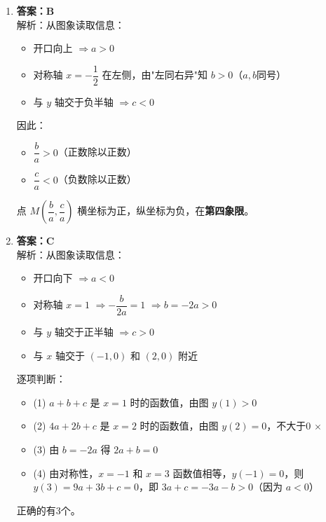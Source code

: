 \documentclass[12pt, a4paper]{article}
\begin{document}
\begin{answerbox}
    \begin{enumerate}
        \item \textbf{答案：B} \\
        解析：从图象读取信息：
        \begin{itemize}
            \item 开口向上 $\Rightarrow a > 0$
            \item 对称轴 $x = -\dfrac{1}{2}$ 在左侧，由"左同右异"知 $b > 0$（$a,b$同号）
            \item 与 $y$ 轴交于负半轴 $\Rightarrow c < 0$
        \end{itemize}
        因此：
        \begin{itemize}
            \item $\dfrac{b}{a} > 0$（正数除以正数）
            \item $\dfrac{c}{a} < 0$（负数除以正数）
        \end{itemize}
        点 $M\left(\dfrac{b}{a}, \dfrac{c}{a}\right)$ 横坐标为正，纵坐标为负，在\textbf{第四象限}。
        
        \item \textbf{答案：C} \\
        解析：从图象读取信息：
        \begin{itemize}
            \item 开口向下 $\Rightarrow a < 0$
            \item 对称轴 $x = 1$ $\Rightarrow -\dfrac{b}{2a} = 1$ $\Rightarrow b = -2a > 0$
            \item 与 $y$ 轴交于正半轴 $\Rightarrow c > 0$
            \item 与 $x$ 轴交于 $(-1,0)$ 和 $(2,0)$ 附近
        \end{itemize}
        逐项判断：
        \begin{itemize}
            \item (1) $a+b+c$ 是 $x=1$ 时的函数值，由图 $y(1) > 0$ \checkmark
            \item (2) $4a+2b+c$ 是 $x=2$ 时的函数值，由图 $y(2) = 0$，不大于0 \textbf{$\times$}
            \item (3) 由 $b = -2a$ 得 $2a+b = 0$ \checkmark
            \item (4) 由对称性，$x=-1$ 和 $x=3$ 函数值相等，$y(-1)=0$，则 $y(3)=9a+3b+c=0$，即 $3a+c=-3a-b>0$（因为 $a<0$）\checkmark
        \end{itemize}
        正确的有3个。
        

\end{enumerate}
\end{answerbox}
\end{document}
